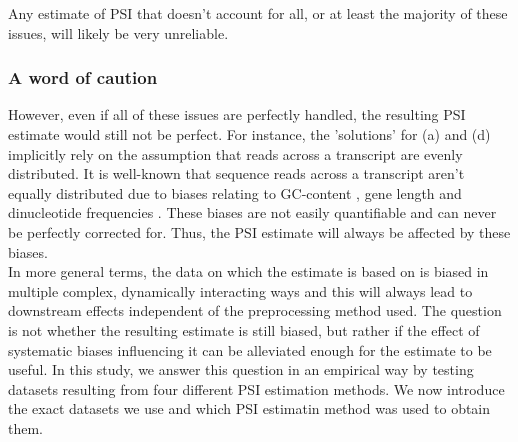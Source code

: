 Any estimate of PSI that doesn't account for all, or at least the majority of these issues, will likely be very unreliable. 

\subsubsection{A word of caution} \label{subsubsec:caution}
However, even if all of these issues are perfectly handled, the resulting PSI estimate would still not be perfect. For instance, the 'solutions' for (a) and (d) implicitly rely on the assumption that reads across a transcript are evenly distributed. It is well-known that sequence reads across a transcript aren't equally distributed due to biases relating to GC-content \cite{gccontentbias}, gene length and dinucleotide frequencies \cite{rnaseqbiascorrection}.
These biases are not easily quantifiable and can never be perfectly corrected for. Thus, the PSI estimate will always be affected by these biases. \\
In more general terms, the data on which the estimate is based on is biased in multiple complex, dynamically interacting ways and this will always lead to downstream effects independent of the preprocessing method used. The question is not whether the resulting estimate is still biased, but rather if the effect of systematic biases influencing it can be alleviated enough for the estimate to be useful. In this study, we answer this question in an empirical way by testing datasets resulting from four different PSI estimation methods. We now introduce the exact datasets we use and which PSI estimatin method was used to obtain them. 
